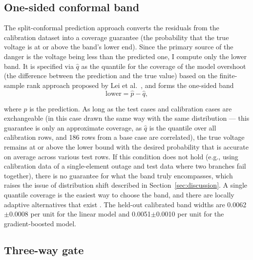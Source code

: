 \documentclass[12pt]{article}
\begin{document}
\subsection{One-sided conformal band}

The split-conformal prediction approach converts the residuals from the calibration dataset into a coverage guarantee (the probability that the true voltage is at or above the band's lower end)\cite{vovk2005,lei2018,angelopoulos2023}. Since the primary source of the danger is the voltage being less than the predicted one, I compute only the lower band. It is specified via $\hat{q}$ as the quantile for the coverage of the model overshoot (the difference between the prediction and the true value) based on the finite-sample rank approach proposed by Lei et al.\ \cite{lei2018}, and forms the one-sided band
\begin{equation}
\text{lower} = \hat{p} - \hat{q},
\end{equation}

where $\hat{p}$ is the prediction. As long as the test cases and calibration cases are exchangeable (in this case drawn the same way with the same distribution — this guarantee is only an approximate coverage, as $\hat{q}$ is the quantile over all calibration rows, and 186 rows from a base case are correlated), the true voltage remains at or above the lower bound with the desired probability that is accurate on average across various test rows. If this condition does not hold (e.g., using calibration data of a single-element outage and test data where two branches fail together), there is no guarantee for what the band truly encompasses, which raises the issue of distribution shift described in Section~\ref{sec:discussion}. A single quantile coverage is the easiest way to choose the band, and there are locally adaptive alternatives that exist \cite{romano2019}. The held-out calibrated band widths are 0.0062$\pm$0.0008 per unit for the linear model and 0.0051$\pm$0.0010 per unit for the gradient-boosted model.

\subsection{Three-way gate}\label{subsec:gate}
\end{document}
